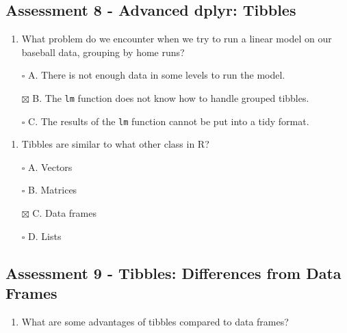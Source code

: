 \documentclass[
]{article}
\providecommand{\tightlist}{%
  \setlength{\itemsep}{0pt}\setlength{\parskip}{0pt}}
\begin{document}
\hypertarget{assessment-8---advanced-dplyr-tibbles}{%
\subsection{Assessment 8 - Advanced dplyr:
Tibbles}\label{assessment-8---advanced-dplyr-tibbles}}

\begin{enumerate}
\def\labelenumi{\arabic{enumi}.}
\tightlist
\item
  What problem do we encounter when we try to run a linear model on our
  baseball data, grouping by home runs?
\end{enumerate}

\begin{itemize}
\tightlist
\item[$\square$]
  A. There is not enough data in some levels to run the model.
\item[$\boxtimes$]
  B. The \texttt{lm} function does not know how to handle grouped
  tibbles.
\item[$\square$]
  C. The results of the \texttt{lm} function cannot be put into a tidy
  format.
\end{itemize}

\begin{enumerate}
\def\labelenumi{\arabic{enumi}.}
\setcounter{enumi}{1}
\tightlist
\item
  Tibbles are similar to what other class in R?
\end{enumerate}

\begin{itemize}
\tightlist
\item[$\square$]
  A. Vectors
\item[$\square$]
  B. Matrices
\item[$\boxtimes$]
  C. Data frames
\item[$\square$]
  D. Lists
\end{itemize}

\hypertarget{assessment-9---tibbles-differences-from-data-frames}{%
\subsection{Assessment 9 - Tibbles: Differences from Data
Frames}\label{assessment-9---tibbles-differences-from-data-frames}}

\begin{enumerate}
\def\labelenumi{\arabic{enumi}.}
\tightlist
\item
  What are some advantages of tibbles compared to data frames?
\end{enumerate}
\end{document}
